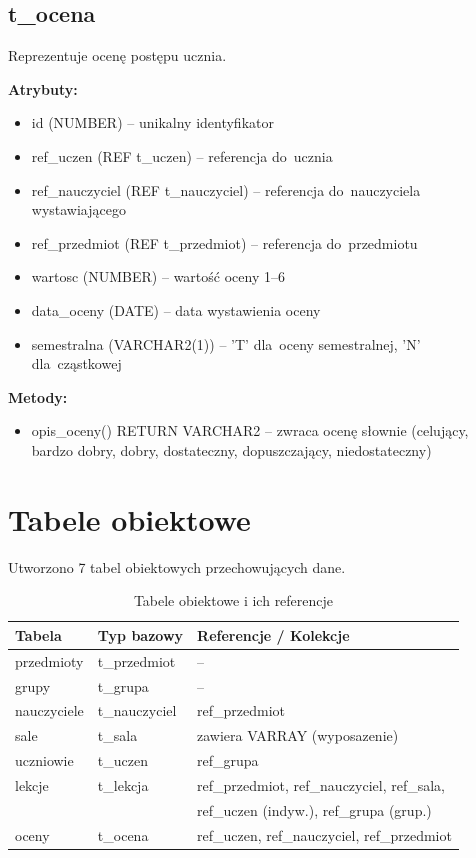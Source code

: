 \documentclass[12pt,a4paper]{article}
\begin{document}
\subsection{t\_ocena}

Reprezentuje ocenę postępu ucznia.

\textbf{Atrybuty:}
\begin{itemize}[nosep]
    \item id (NUMBER) -- unikalny identyfikator
    \item ref\_uczen (REF t\_uczen) -- referencja do~ucznia
    \item ref\_nauczyciel (REF t\_nauczyciel) -- referencja do~nauczyciela wystawiającego
    \item ref\_przedmiot (REF t\_przedmiot) -- referencja do~przedmiotu
    \item wartosc (NUMBER) -- wartość oceny 1--6
    \item data\_oceny (DATE) -- data wystawienia oceny
    \item semestralna (VARCHAR2(1)) -- 'T' dla~oceny semestralnej, 'N' dla~cząstkowej
\end{itemize}

\textbf{Metody:}
\begin{itemize}[nosep]
    \item opis\_oceny() RETURN VARCHAR2 -- zwraca ocenę słownie (celujący, bardzo dobry, dobry, dostateczny, dopuszczający, niedostateczny)
\end{itemize}

\newpage
\section{Tabele obiektowe}

Utworzono 7 tabel obiektowych przechowujących dane.

\begin{table}[h]
\centering
\begin{tabular}{|l|l|l|}
\hline
\textbf{Tabela} & \textbf{Typ bazowy} & \textbf{Referencje / Kolekcje} \\
\hline
przedmioty & t\_przedmiot & -- \\
grupy & t\_grupa & -- \\
nauczyciele & t\_nauczyciel & ref\_przedmiot \\
sale & t\_sala & zawiera VARRAY (wyposazenie) \\
uczniowie & t\_uczen & ref\_grupa \\
lekcje & t\_lekcja & ref\_przedmiot, ref\_nauczyciel, ref\_sala, \\
       &           & ref\_uczen (indyw.), ref\_grupa (grup.) \\
oceny & t\_ocena & ref\_uczen, ref\_nauczyciel, ref\_przedmiot \\
\hline
\end{tabular}
\caption{Tabele obiektowe i ich referencje}
\end{table}
\end{document}

